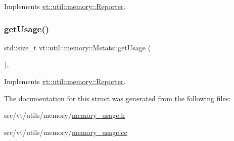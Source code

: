 Implements \hyperlink{structvt_1_1util_1_1memory_1_1_reporter_a83fc36e9cff3ce2deedf1d4546694713}{vt\+::util\+::memory\+::\+Reporter}.

\mbox{\label{structvt_1_1util_1_1memory_1_1_mstats_aa3ba12317492d6f3c95f6b2bbb20f831}} 
\subsubsection{\texorpdfstring{get\+Usage()}{getUsage()}}
{\footnotesize\ttfamily std\+::size\+\_\+t vt\+::util\+::memory\+::\+Mstats\+::get\+Usage (\begin{DoxyParamCaption}{ }\end{DoxyParamCaption})\hspace{0.3cm}{\ttfamily [override]}, {\ttfamily [virtual]}}



Implements \hyperlink{structvt_1_1util_1_1memory_1_1_reporter_a372574f51fdb68077cd3d227ee373de5}{vt\+::util\+::memory\+::\+Reporter}.



The documentation for this struct was generated from the following files\+:\begin{DoxyCompactItemize}
\item 
src/vt/utils/memory/\hyperlink{memory__usage_8h}{memory\+\_\+usage.\+h}\item 
src/vt/utils/memory/\hyperlink{memory__usage_8cc}{memory\+\_\+usage.\+cc}\end{DoxyCompactItemize}
